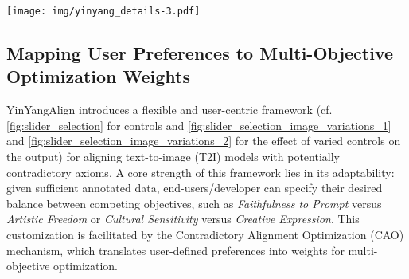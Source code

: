 \begin{figure*}[htb!]
    \centering
    \texttt{[image: img/yinyang\_details-3.pdf]}
    \caption{A Comprehensive Visual Depiction of Alignment Trade-offs for \textit{"Pentagon is under fire"} and \textit{"Images of Vikings"} Across Alignment Axioms.  
\textbf{(Row 1:)} \textit{Pentagon is under fire.}  
This row demonstrates the trade-off between \textbf{Verifiability} and \textbf{Artistic Freedom}. The rightmost image depicts a verifiable and realistic representation of the Pentagon under fire, emphasizing factual accuracy. Progressing to the left, the images increasingly prioritize artistic freedom, featuring surreal fire patterns, dramatic lighting, and exaggerated destruction, illustrating the tension between verifiability and creativity.  
\textbf{(Row 2:)} \textit{Images of Vikings.}  
This row examines the balance between \textbf{Cultural Sensitivity} and \textbf{Artistic Freedom}. The leftmost image highlights cultural diversity and sensitivity, showcasing gender-balanced and ethnically varied Vikings, including Asian, African, and Mexican influences. Moving towards the right, artistic freedom faded, leading to depictions of Nordic-centric, rugged warriors with reduced diversity. This evolution highlights how cultural sensitivity diminishes as artistic freedom decreases.  
\textbf{Adjustable Parameters:} Alignment parameters, such as \textbf{Faithfulness}, \textbf{Artistic Freedom}, \textbf{Verifiability}, and \textbf{Cultural Sensitivity}, are depicted through sliders for each prompt. These settings demonstrate the trade-offs influencing the alignment results, enabling an evaluation of the model's ability to balance competing objectives.}
    \label{fig:slider_selection_image_variations_2}
    \vspace{-3mm}
\end{figure*}


\subsection{Mapping User Preferences to Multi-Objective Optimization Weights}

YinYangAlign introduces a flexible and user-centric framework (cf. \cref{fig:slider_selection} for controls and \cref{fig:slider_selection_image_variations_1} and \cref{fig:slider_selection_image_variations_2} for the effect of varied controls on the output) for aligning text-to-image (T2I) models with potentially contradictory axioms. A core strength of this framework lies in its adaptability: given sufficient annotated data, end-users/developer can specify their desired balance between competing objectives, such as \emph{Faithfulness to Prompt} versus \emph{Artistic Freedom} or \emph{Cultural Sensitivity} versus \emph{Creative Expression}. This customization is facilitated by the Contradictory Alignment Optimization (CAO) mechanism, which translates user-defined preferences into weights for multi-objective optimization.


